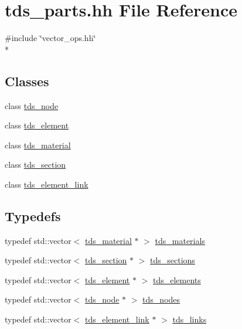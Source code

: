 \hypertarget{tds__parts_8hh}{}\section{tds\+\_\+parts.\+hh File Reference}
\label{tds__parts_8hh}
{\ttfamily \#include \char`\"{}vector\+\_\+ops.\+hh\char`\"{}}\\*
\subsection*{Classes}
\begin{DoxyCompactItemize}
\item 
class \hyperlink{classtds__node}{tds\+\_\+node}
\item 
class \hyperlink{classtds__element}{tds\+\_\+element}
\item 
class \hyperlink{classtds__material}{tds\+\_\+material}
\item 
class \hyperlink{classtds__section}{tds\+\_\+section}
\item 
class \hyperlink{classtds__element__link}{tds\+\_\+element\+\_\+link}
\end{DoxyCompactItemize}
\subsection*{Typedefs}
\begin{DoxyCompactItemize}
\item 
typedef std\+::vector$<$ \hyperlink{classtds__material}{tds\+\_\+material} $\ast$ $>$ \hyperlink{tds__parts_8hh_a972ae401709b50fd79befb06dd952170}{tds\+\_\+materials}
\item 
typedef std\+::vector$<$ \hyperlink{classtds__section}{tds\+\_\+section} $\ast$ $>$ \hyperlink{tds__parts_8hh_aef503d0ac251112b915fc3a8918962f2}{tds\+\_\+sections}
\item 
typedef std\+::vector$<$ \hyperlink{classtds__element}{tds\+\_\+element} $\ast$ $>$ \hyperlink{tds__parts_8hh_af35ca3b18f7ed6e38a9bfb5639d5a23e}{tds\+\_\+elements}
\item 
typedef std\+::vector$<$ \hyperlink{classtds__node}{tds\+\_\+node} $\ast$ $>$ \hyperlink{tds__parts_8hh_ad445cf91d41fc0e37fcaf259adec00ef}{tds\+\_\+nodes}
\item 
typedef std\+::vector$<$ \hyperlink{classtds__element__link}{tds\+\_\+element\+\_\+link} $\ast$ $>$ \hyperlink{tds__parts_8hh_a5d3b1cd92297b3ee827cdf0fff431aef}{tds\+\_\+links}
\end{DoxyCompactItemize}


